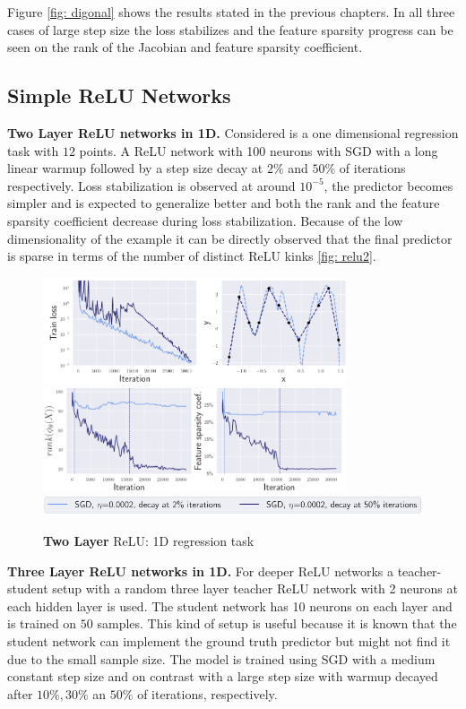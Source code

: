 Figure \ref{fig: digonal} shows the results stated in the previous chapters.
In all three cases of large step size the loss stabilizes and the feature
sparsity progress can be seen on the rank of the Jacobian and feature
sparsity coefficient.



\subsection{Simple ReLU Networks}
\textbf{Two Layer ReLU networks in 1D.}
Considered is a one dimensional regression task with $12$ points. A ReLU
network with 100 neurons with SGD with a long linear warmup followed by a
step size decay at $2\%$ and $50\%$ of iterations respectively. Loss
stabilization is observed at around $10^{-5}$, the predictor becomes simpler
and is expected to generalize better and both the rank and the feature
sparsity coefficient decrease during loss stabilization. Because of the
low dimensionality of the example it can be directly observed that the final
predictor is sparse in terms of the number of distinct ReLU kinks \ref{fig:
relu2}.

\begin{figure}[H]
    \centering
    \includegraphics[width=0.8\textwidth]{./pics/relu2_loss.png}
    \includegraphics[width=0.8\textwidth]{./pics/relu2_sparsity.png}
    \includegraphics[width=\textwidth]{./pics/relu2_setup.png}
    \caption{\textbf{Two Layer} ReLU: 1D regression task \label{fig: relu2}}
\end{figure}


\textbf{Three Layer ReLU networks in 1D.}
For deeper ReLU networks a teacher-student setup with a random three layer
teacher ReLU network with 2 neurons at each hidden layer is used. The student
network has 10 neurons on each layer and is trained on $50$ samples. This
kind of setup is useful because it is known that the student network can
implement the ground truth predictor but might not find it due to the small
sample size. The model is trained using SGD with a medium constant step size
and on contrast with a large step size with warmup decayed after $10\%, 30\%$
an $50\%$ of iterations, respectively.

